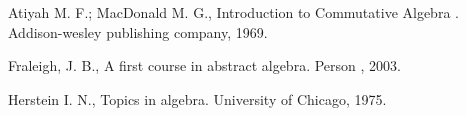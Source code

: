 \documentclass[10pt,a4paper]{article}
\begin{document}
\newpage

\begin{thebibliography}{20}
	
	  Atiyah M. F.; MacDonald M. G., Introduction to Commutative Algebra . Addison-wesley publishing company, 1969.
	
	  Fraleigh, J. B., A first course in abstract algebra. Person , 2003.
	
	 Herstein I. N., Topics in algebra. University of Chicago, 1975.	
	
\end{thebibliography}
\end{document}

